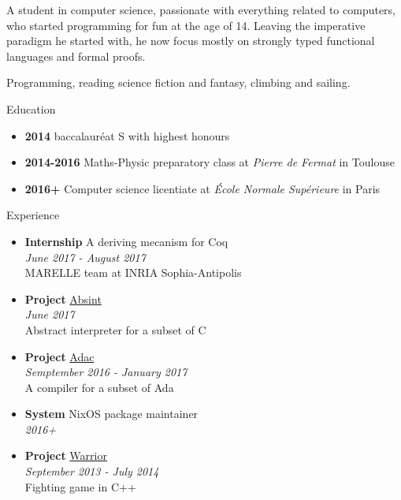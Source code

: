\documentclass[a4paper,14pt]{extarticle}
\newcommand{\cvtitle}[1]{
    \begin{tcolorbox}[colback=bgcol,colframe=ForestGreen,
        height=1cm, valign=center, sharp corners=downhill]
        {\Large #1}
    \end{tcolorbox}
}
\begin{document}
\begin{minipage}[c]{0.35\linewidth}
\begin{tcolorbox}
        \vspace{1cm}

        A student in computer science, passionate with everything related to
        computers, who started programming for fun at the age of 14. Leaving
        the imperative paradigm he started with, he now focus mostly on
        strongly typed functional languages and formal proofs.

        \vspace{1cm}

        Programming, reading science fiction and fantasy, climbing and sailing.

    \end{tcolorbox}\end{minipage}
    \hfill
    \begin{minipage}[c][282mm][t]{0.60\linewidth}

        \cvtitle{Education}

        \begin{itemize}
            \item \textbf{2014} baccalauréat S with highest honours
            \item \textbf{2014-2016} Maths-Physic preparatory class at \emph{Pierre de Fermat} in Toulouse
            \item \textbf{2016+} Computer science licentiate at \emph{École Normale Supérieure} in Paris
        \end{itemize}

        \cvtitle{Experience}

        \begin{itemize}
            \item \textbf{Internship} A deriving mecanism for Coq \\
                \emph{June 2017 - August 2017} \\
                MARELLE team at INRIA Sophia-Antipolis
            \item \textbf{Project} \href{https://github.com/lucas8/absint}{Absint} \\
                \emph{June 2017} \\
                Abstract interpreter for a subset of C
            \item \textbf{Project} \href{https://github.com/TWal/ENS\_Adac}{Adac} \\
                \emph{Semptember 2016 - January 2017} \\
                A compiler for a subset of Ada
            \item \textbf{System} NixOS package maintainer \\
                \emph{2016+}
            \item \textbf{Project} \href{https://github.com/DWARVES/Project-Warrior}{Warrior} \\
                \emph{September 2013 - July 2014} \\
                Fighting game in C++
        \end{itemize}


\end{minipage}
\end{document}
